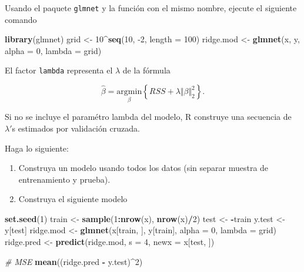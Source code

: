 \documentclass[
  12pt,
]{book}
\newenvironment{Shaded}{\begin{snugshade}}{\end{snugshade}}
\newcommand{\CommentTok}[1]{\textcolor[rgb]{0.56,0.35,0.01}{\textit{#1}}}
\newcommand{\DataTypeTok}[1]{\textcolor[rgb]{0.13,0.29,0.53}{#1}}
\newcommand{\DecValTok}[1]{\textcolor[rgb]{0.00,0.00,0.81}{#1}}
\newcommand{\KeywordTok}[1]{\textcolor[rgb]{0.13,0.29,0.53}{\textbf{#1}}}
\newcommand{\NormalTok}[1]{#1}
\newcommand{\OperatorTok}[1]{\textcolor[rgb]{0.81,0.36,0.00}{\textbf{#1}}}
\newcommand{\StringTok}[1]{\textcolor[rgb]{0.31,0.60,0.02}{#1}}
\theoremstyle{definition}
\theoremstyle{definition}
\theoremstyle{definition}
\theoremstyle{remark}
\begin{document}
Usando el paquete \texttt{glmnet} y la función con el mismo nombre, ejecute el siguiente comando

\begin{Shaded}
\begin{Highlighting}[]
\KeywordTok{library}\NormalTok{(glmnet)}
\NormalTok{grid <-}\StringTok{ }\DecValTok{10}\OperatorTok{^}\KeywordTok{seq}\NormalTok{(}\DecValTok{10}\NormalTok{, }\DecValTok{-2}\NormalTok{, }\DataTypeTok{length =} \DecValTok{100}\NormalTok{)}
\NormalTok{ridge.mod <-}\StringTok{ }\KeywordTok{glmnet}\NormalTok{(x, y, }\DataTypeTok{alpha =} \DecValTok{0}\NormalTok{, }\DataTypeTok{lambda =}\NormalTok{ grid)}
\end{Highlighting}
\end{Shaded}

El factor \texttt{lambda} representa el \(\lambda\) de la fórmula

\[ \hat{\beta} = \underset{\beta}{\mathrm{argmin}} \left\{RSS + \lambda \Vert \beta \Vert_2^2\right\}.\]

Si no se incluye el paramétro lambda del modelo, R construye una secuencia de \(\lambda'\)s estimados por validación cruzada.

Haga lo siguiente:

\begin{enumerate}
\def\labelenumi{\arabic{enumi}.}
\item
  Construya un modelo usando todos los datos (sin separar muestra de entrenamiento y prueba).
\item
  Construya el siguiente modelo
\end{enumerate}

\begin{Shaded}
\begin{Highlighting}[]
\KeywordTok{set.seed}\NormalTok{(}\DecValTok{1}\NormalTok{)}
\NormalTok{train <-}\StringTok{ }\KeywordTok{sample}\NormalTok{(}\DecValTok{1}\OperatorTok{:}\KeywordTok{nrow}\NormalTok{(x), }\KeywordTok{nrow}\NormalTok{(x)}\OperatorTok{/}\DecValTok{2}\NormalTok{)}
\NormalTok{test <-}\StringTok{ }\OperatorTok{-}\NormalTok{train}
\NormalTok{y.test <-}\StringTok{ }\NormalTok{y[test]}
\NormalTok{ridge.mod <-}\StringTok{ }\KeywordTok{glmnet}\NormalTok{(x[train, ], y[train], }\DataTypeTok{alpha =} \DecValTok{0}\NormalTok{, }
    \DataTypeTok{lambda =}\NormalTok{ grid)}
\NormalTok{ridge.pred <-}\StringTok{ }\KeywordTok{predict}\NormalTok{(ridge.mod, }\DataTypeTok{s =} \DecValTok{4}\NormalTok{, }\DataTypeTok{newx =}\NormalTok{ x[test, }
\NormalTok{    ])}

\CommentTok{# MSE}
\KeywordTok{mean}\NormalTok{((ridge.pred }\OperatorTok{-}\StringTok{ }\NormalTok{y.test)}\OperatorTok{^}\DecValTok{2}\NormalTok{)}
\end{Highlighting}
\end{Shaded}
\end{document}
